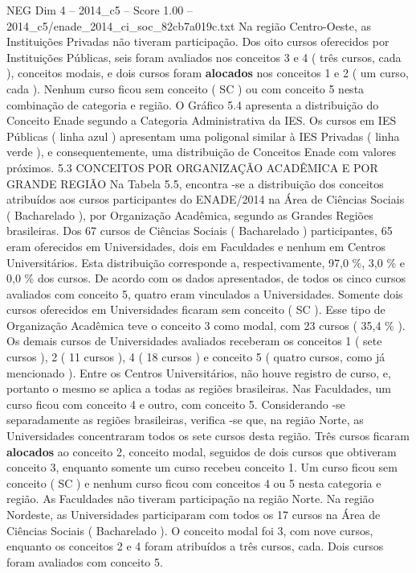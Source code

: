 \begin{textsample}{NEG Dim 4 – 2014\_c5 – Score 1.00 – 2014\_c5/enade\_2014\_ci\_soc\_82cb7a019c.txt}
Na região Centro-Oeste, as Instituições Privadas não tiveram participação.
Dos oito cursos oferecidos por Instituições Públicas, seis foram avaliados nos conceitos 3 e 4 ( três cursos, cada ), conceitos modais, e dois cursos foram \textbf{alocados} nos conceitos 1 e 2 ( um curso, cada ).
Nenhum curso ficou sem conceito ( SC ) ou com conceito 5 nesta combinação de categoria e região.
O Gráfico 5.4 apresenta a distribuição do Conceito Enade segundo a Categoria Administrativa da IES.
Os cursos em IES Públicas ( linha azul ) apresentam uma poligonal similar à IES Privadas ( linha verde ), e consequentemente, uma distribuição de Conceitos Enade com valores próximos. 5.3 CONCEITOS POR ORGANIZAÇÃO ACADÊMICA E POR GRANDE REGIÃO Na Tabela 5.5, encontra -se a distribuição dos conceitos atribuídos aos cursos participantes do ENADE/2014 na Área de Ciências Sociais ( Bacharelado ), por Organização Acadêmica, segundo as Grandes Regiões brasileiras.
Dos 67 cursos de Ciências Sociais ( Bacharelado ) participantes, 65 eram oferecidos em Universidades, dois em Faculdades e nenhum em Centros Universitários.
Esta distribuição corresponde a, respectivamente, 97,0 \%, 3,0 \% e 0,0 \% dos cursos.
De acordo com os dados apresentados, de todos os cinco cursos avaliados com conceito 5, quatro eram vinculados a Universidades.
Somente dois cursos oferecidos em Universidades ficaram sem conceito ( SC ).
Esse tipo de Organização Acadêmica teve o conceito 3 como modal, com 23 cursos ( 35,4 \% ).
Os demais cursos de Universidades avaliados receberam os conceitos 1 ( sete cursos ), 2 ( 11 cursos ), 4 ( 18 cursos ) e conceito 5 ( quatro cursos, como já mencionado ).
Entre os Centros Universitários, não houve registro de curso, e, portanto o mesmo se aplica a todas as regiões brasileiras.
Nas Faculdades, um curso ficou com conceito 4 e outro, com conceito 5.
Considerando -se separadamente as regiões brasileiras, verifica -se que, na região Norte, as Universidades concentraram todos os sete cursos desta região.
Três cursos ficaram \textbf{alocados} ao conceito 2, conceito modal, seguidos de dois cursos que obtiveram conceito 3, enquanto somente um curso recebeu conceito 1.
Um curso ficou sem conceito ( SC ) e nenhum curso ficou com conceitos 4 ou 5 nesta categoria e região.
As Faculdades não tiveram participação na região Norte.
Na região Nordeste, as Universidades participaram com todos os 17 cursos na Área de Ciências Sociais ( Bacharelado ).
O conceito modal foi 3, com nove cursos, enquanto os conceitos 2 e 4 foram atribuídos a três cursos, cada.
Dois cursos foram avaliados com conceito 5.

\end{textsample}
